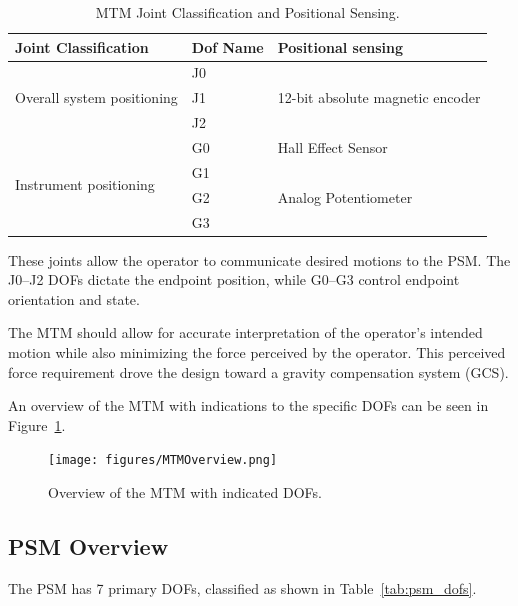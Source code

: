 \begin{table}[H] 
    \caption{MTM Joint Classification and Positional Sensing.}
    \label{tab:mtm_dofs_detailed}
    \begin{tabular}{|l|l|l|}
    \hline
    \textbf{Joint Classification} & \textbf{Dof Name} & \textbf{Positional sensing} \\
    \hline
    \multirow{3}{*}{\raggedright Overall system positioning} & J0 & \multirow{3}{*}{12-bit absolute magnetic encoder} \\
    & J1 & \\
    & J2 & \\
    \hline
    \multirow{4}{*}{\raggedright Instrument positioning} & G0 & Hall Effect Sensor \\
    \cline{2-3}
    & G1 & \multirow{3}{*}{Analog Potentiometer} \\
    & G2 & \\
    & G3 & \\
    \hline
    \end{tabular}
\end{table}
These joints allow the operator to communicate desired motions to the PSM. The J0--J2 DOFs dictate the endpoint position, while G0--G3 control endpoint orientation and state.

The MTM should allow for accurate interpretation of the operator's intended motion while also minimizing the force perceived by the operator. This perceived force requirement drove the design toward a gravity compensation system (GCS).

An overview of the MTM with indications to the specific DOFs can be seen in Figure~\ref{fig:mtm_dofs}.

\begin{figure}[H] %
    \centering
    \texttt{[image: figures/MTMOverview.png]} %
    \caption{Overview of the MTM with indicated DOFs.}
    \label{fig:mtm_dofs}
\end{figure}

\subsection{PSM Overview}

The PSM has 7 primary DOFs, classified as shown in Table~\ref{tab:psm_dofs}.


